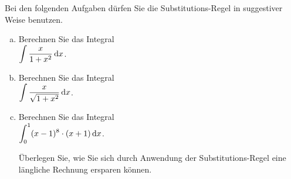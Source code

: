 \exercise
Bei den folgenden Aufgaben d\"urfen Sie die Substitutions-Regel in suggestiver Weise benutzen.
\begin{enumerate}[(a)]
\item Berechnen Sie das Integral
      \\[0.2cm]
      \hspace*{1.3cm}
      $\displaystyle\int\frac{x}{1 + x^2} \, \textrm{d} x$.
\item Berechnen Sie das Integral
      \\[0.2cm]
      \hspace*{1.3cm}
      $\displaystyle\int\frac{x}{\sqrt{1 + x^2}} \, \textrm{d} x$.
\item Berechnen Sie das Integral
      \\[0.2cm]
      \hspace*{1.3cm}
      $\displaystyle\int_0^1 (x-1)^8 \cdot (x+1) \, \textrm{d} x$.

      \hint
      \"Uberlegen Sie, wie Sie sich durch Anwendung der Substitutions-Regel eine l\"angliche Rechnung ersparen k\"onnen.
      \eox
\end{enumerate}


